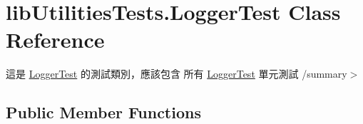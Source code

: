 \hypertarget{classlib_utilities_tests_1_1_logger_test}{\section{lib\+Utilities\+Tests.\+Logger\+Test Class Reference}
\label{classlib_utilities_tests_1_1_logger_test}
}


這是 \hyperlink{classlib_utilities_tests_1_1_logger_test}{Logger\+Test} 的測試類別，應該包含 所有 \hyperlink{classlib_utilities_tests_1_1_logger_test}{Logger\+Test} 單元測試 /summary$>$  


\subsection*{Public Member Functions}
